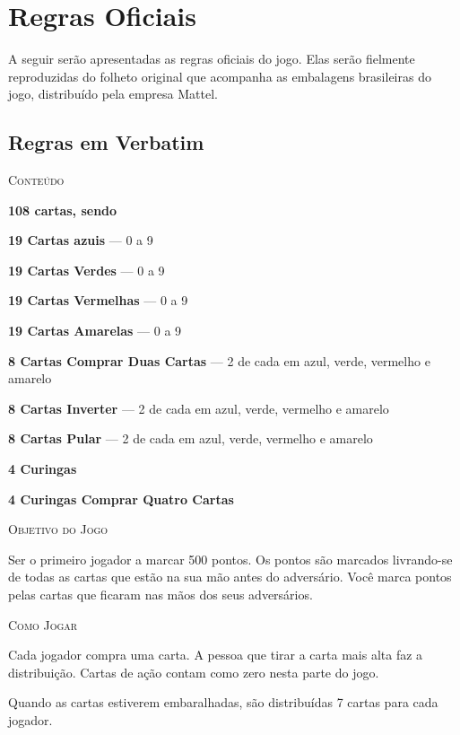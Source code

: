 \section{Regras Oficiais}

A seguir serão apresentadas as regras oficiais do jogo. Elas serão fielmente reproduzidas do folheto original que acompanha as embalagens brasileiras do jogo, distribuído pela empresa Mattel. 

\subsection{Regras em Verbatim}

\vspace{0.5cm}

\textsc{\large{Conteúdo}}

\textbf{108 cartas, sendo}

\textbf{19 Cartas azuis} --- 0 a 9

\textbf{19 Cartas Verdes} --- 0 a 9

\textbf{19 Cartas Vermelhas} --- 0 a 9

\textbf{19 Cartas Amarelas} --- 0 a 9

\textbf{8 Cartas Comprar Duas Cartas} --- 2 de cada em azul, verde, vermelho e amarelo

\textbf{8 Cartas Inverter} --- 2 de cada em azul, verde, vermelho e amarelo

\textbf{8 Cartas Pular} --- 2 de cada em azul, verde, vermelho e amarelo

\textbf{4 Curingas}

\textbf{4 Curingas Comprar Quatro Cartas}

\vspace{0.5cm}

\textsc{\large{Objetivo do Jogo}}

Ser o primeiro jogador a marcar 500 pontos. Os pontos são marcados livrando-se de todas as cartas que estão na sua mão antes do adversário. Você marca pontos pelas cartas que ficaram nas mãos dos seus adversários.

\vspace{0.5cm}

\textsc{\large{Como Jogar}}

Cada jogador compra uma carta. A pessoa que tirar a carta mais alta faz a distribuição. Cartas de ação contam como zero nesta parte do jogo.

Quando as cartas estiverem embaralhadas, são distribuídas 7 cartas para cada jogador.

